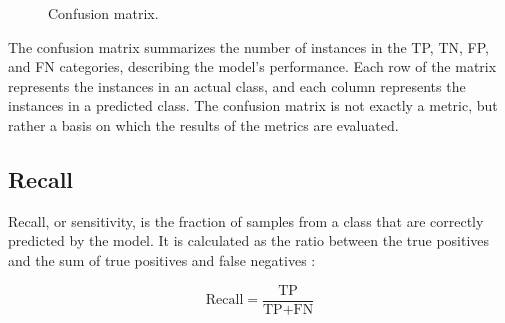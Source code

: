 \begin{figure}[H]
\begin{center}
\caption{Confusion matrix.}
\end{center}
\end{figure}

The confusion matrix summarizes the number of instances in the TP, TN, FP, and FN categories, describing the model's performance. Each row of the matrix represents the instances in an actual class, and each column represents the instances in a predicted class. The confusion matrix is not exactly a metric, but rather a basis on which the results of the metrics are evaluated.

\subsection{Recall}

Recall, or sensitivity, is the fraction of samples from a class that are correctly predicted by the model. It is calculated as the ratio between the true positives and the sum of true positives and false negatives \cite{Métricas}:

\begin{center}
\begin{equation}
\text{Recall} = \dfrac{\text{TP}}{\text{TP} + \text{FN}}
\end{equation}
\end{center}

